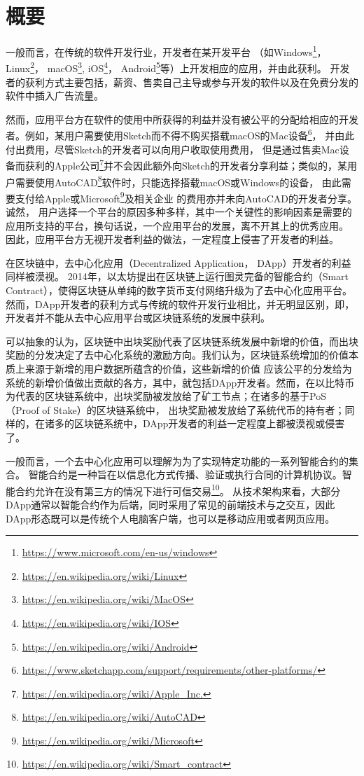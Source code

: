 \section{概要}

一般而言，在传统的软件开发行业，开发者在某开发平台
（如Windows\footnote{\url{https://www.microsoft.com/en-us/windows}}，Linux\footnote{\url{https://en.wikipedia.org/wiki/Linux}}，
macOS\footnote{\url{https://en.wikipedia.org/wiki/MacOS}},
iOS\footnote{\url{https://en.wikipedia.org/wiki/IOS}}，
Android\footnote{\url{https://en.wikipedia.org/wiki/Android}}等）上开发相应的应用，并由此获利。
开发者的获利方式主要包括，薪资、售卖自己主导或参与开发的软件以及在免费分发的软件中插入广告流量。

然而，应用平台方在软件的使用中所获得的利益并没有被公平的分配给相应的开发者。例如，某用户需要使用Sketch而不得不购买搭载macOS的Mac设备\footnote{\url{https://www.sketchapp.com/support/requirements/other-platforms/}}，
并由此付出费用，尽管Sketch的开发者可以向用户收取使用费用，
但是通过售卖Mac设备而获利的Apple公司\footnote{\url{https://en.wikipedia.org/wiki/Apple_Inc.}}并不会因此额外向Sketch的开发者分享利益；类似的，某用户需要使用AutoCAD\footnote{\url{https://en.wikipedia.org/wiki/AutoCAD}}软件时，只能选择搭载macOS或Windows的设备，
由此需要支付给Apple或Microsoft\footnote{\url{https://en.wikipedia.org/wiki/Microsoft}}及相关企业
的费用亦并未向AutoCAD的开发者分享。
诚然， 用户选择一个平台的原因多种多样，其中一个关键性的影响因素是需要的应用所支持的平台，换句话说，一个应用平台的发展，离不开其上的优秀应用。
因此，应用平台方无视开发者利益的做法，一定程度上侵害了开发者的利益。

在区块链中，去中心化应用（Decentralized Application， DApp）开发者的利益同样被漠视。
2014年，以太坊提出在区块链上运行图灵完备的智能合约（Smart Contract），使得区块链从单纯的数字货币支付网络升级为了去中心化应用平台。
然而，DApp开发者的获利方式与传统的软件开发行业相比，并无明显区别，即，开发者并不能从去中心应用平台或区块链系统的发展中获利。

可以抽象的认为，区块链中出块奖励代表了区块链系统发展中新增的价值，而出块奖励的分发决定了去中心化系统的激励方向。我们认为，区块链系统增加的价值本质上来源于新增的用户数据所蕴含的价值，这些新增的价值
应该公平的分发给为系统的新增价值做出贡献的各方，其中，就包括DApp开发者。然而，在以比特币为代表的区块链系统中，出块奖励被发放给了矿工节点；在诸多的基于PoS（Proof of Stake）的区块链系统中，
出块奖励被发放给了系统代币的持有者；同样的，在诸多的区块链系统中，DApp开发者的利益一定程度上都被漠视或侵害了。

一般而言，一个去中心化应用可以理解为为了实现特定功能的一系列智能合约的集合。
智能合约是一种旨在以信息化方式传播、验证或执行合同的计算机协议。智能合约允许在没有第三方的情况下进行可信交易\footnote{\url{https://en.wikipedia.org/wiki/Smart\_contract}}。
从技术架构来看，大部分DApp通常以智能合约作为后端，同时采用了常见的前端技术与之交互，因此DApp形态既可以是传统个人电脑客户端，也可以是移动应用或者网页应用。

